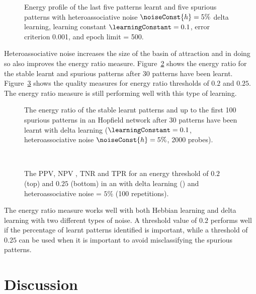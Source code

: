 \begin{figure}[tbp]
	\small
	\center
		
	\caption{Energy profile of the last five patterns learnt and five spurious patterns with heteroassociative noise $\noiseConst{h}=5\%$ delta learning, learning constant $\learningConstant =0.1$, error criterion 0.001, and  epoch limit = 500.}
	\label{fig:EPDeltaHetero50}
\end{figure} 

Heteroassociative noise increases the size of the basin of attraction and in doing so also improves the energy ratio measure.  Figure~\ref{fig:ERHeteromeasure30} shows the energy ratio for the stable learnt and spurious patterns after 30 patterns have been learnt. Figure~\ref{fig:ERHeteromeasure0-49} shows the quality measures for energy ratio thresholds of $0.2$ and $0.25$.  The energy ratio measure is still performing well with this type of learning.    

\begin{figure}[tbp]
\center
\small
	
	\caption{The energy ratio of the stable learnt patterns and up to the first 100 spurious patterns in an  Hopfield network after 30 patterns have been learnt with delta learning ($\learningConstant =0.1$, heteroassociative noise $\noiseConst{h}=5\%$, 2000 probes).}
	\label{fig:ERHeteromeasure30}
\end{figure}

\begin{figure}[p]
 \center
 \small
	
  \vspace{1cm}\\
	
	\caption{The PPV, NPV , TNR and TPR for an energy threshold of $0.2$ (top) and $0.25$ (bottom) in an  with delta learning () and heteroassociative noise  = $5\%$ (100 repetitions).}
	\label{fig:ERHeteromeasure0-49}
\end{figure}

The energy ratio measure works well with both Hebbian learning and delta learning with two different types of noise.  A threshold value of $0.2$ performs well if the percentage of learnt patterns identified is important, while a threshold of $0.25$ can be used when it is important to avoid misclassifying the spurious patterns.  

\section{Discussion}

